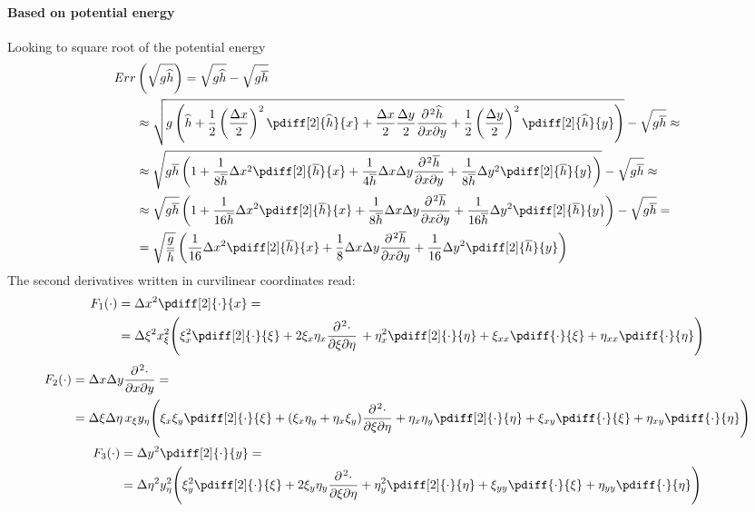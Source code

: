 \paragraph*{Based on potential energy}
Looking to square root of the potential energy
\begin{align}
    {\mathit Err} & \left( \sqrt{g \widehat{h}} \right) = \sqrt{g \widehat{h}}
    - \sqrt{g \overline{h}}
    \\*
    & \approx \sqrt{g
        \left(\hhat +
        \half
        \left( \frac{\Dx}{2} \right)^2 \pdiff[2]{\hhat}{x}
        + \frac{\Dx}{2} \frac{\Dy}{2}  \frac{\partial\kern 0.083333em^2 \hhat}{\partial x \partial y}
        + \half \left( \frac{\Dy}{2} \right)^2 \pdiff[2]{\hhat}{y}
        \right)
    }
    - \sqrt{g\hbar} \approx
    \\
    & \approx \sqrt{g\hbar\left(1 + \frac{1}{8\hbar}\Dx^2\pdiff[2]{\hbar}{x} +
        \frac{1}{4\hbar}\Dx\Dy\frac{\partial\kern 0.083333em^2 \hbar}{\partial x \partial y} +
        \frac{1}{8\hbar}\Dy^2\pdiff[2]{\hbar}{y}\right)}
    - \sqrt{g\hbar} \approx
    \\
    &\approx \sqrt{g\hbar}\left(1 + \frac{1}{16\hbar}\Dx^2\pdiff[2]{\hbar}{x} +
    \frac{1}{8\hbar}\Dx\Dy\frac{\partial\kern 0.083333em^2 \hbar}{\partial x \partial y} +
    \frac{1}{16\hbar}\Dy^2\pdiff[2]{\hbar}{y}\right)
    - \sqrt{g\hbar} =
    \\
    & = \sqrt{\frac{g}{\hbar}}\left( \frac{1}{16}\Dx^2\pdiff[2]{\hbar}{x} +
    \frac{1}{8}\Dx\Dy\frac{\partial\kern 0.083333em^2 \hbar}{\partial x \partial y} +
    \frac{1}{16}\Dy^2\pdiff[2]{\hbar}{y} \right)
\end{align}
The second derivatives written in curvilinear coordinates read:
\begin{align}
    F_1(\cdot) & = \Dx^2\pdiff[2]{\cdot}{x} =
    \\*
    & =
    \Dxi^2 x_\xi^2\Bigg(\xi_x^2 \pdiff[2]{\cdot}{\xi}
    + 2 \xi_x \eta_x \frac{\partial\kern 0.083333em^2 \cdot}{\partial \xi \partial \eta}\,
    + \eta_x^2 \pdiff[2]{\cdot}{\eta}
    + \xi_{xx} \pdiff{\cdot}{\xi}
    + \eta_{xx} \pdiff{\cdot}{\eta}
    \Bigg)
    \label{eq:d2hdx2}
\end{align}
\begin{align}
    F_2(\cdot) & = \Dx\Dy\frac{\partial\kern 0.083333em^2 \cdot}{\partial x \partial y} =
    \\*
    & =
    \Dxi\Deta\, x_\xi y_\eta \Bigg(\xi_x \xi_y \pdiff[2]{\cdot}{\xi}
    + (\xi_x \eta_y + \eta_x \xi_y) \frac{\partial\kern 0.083333em^2 \cdot}{\partial \xi \partial \eta}
    + \eta_x \eta_y \pdiff[2]{\cdot}{\eta}
    + \xi_{xy} \pdiff{\cdot}{\xi}
    + \eta_{xy} \pdiff{\cdot}{\eta}
    \Bigg)
    \label{eq:d2hdxdy}
\end{align}
\begin{align}
    F_3(\cdot) & = \Dy^2\pdiff[2]{\cdot}{y} =
    \\*
    & =
    \Deta^2 y_\eta^2 \Bigg(\xi_y^2   \pdiff[2]{\cdot}{\xi}
    + 2 \xi_y \eta_y \frac{\partial\kern 0.083333em^2 \cdot}{\partial \xi \partial \eta}
    + \eta_y^2 \pdiff[2]{\cdot}{\eta}
    + \xi_{yy} \pdiff{\cdot}{\xi}
    + \eta_{yy} \pdiff{\cdot}{\eta}
    \Bigg)
    \label{eq:d2hdy2}
\end{align}

